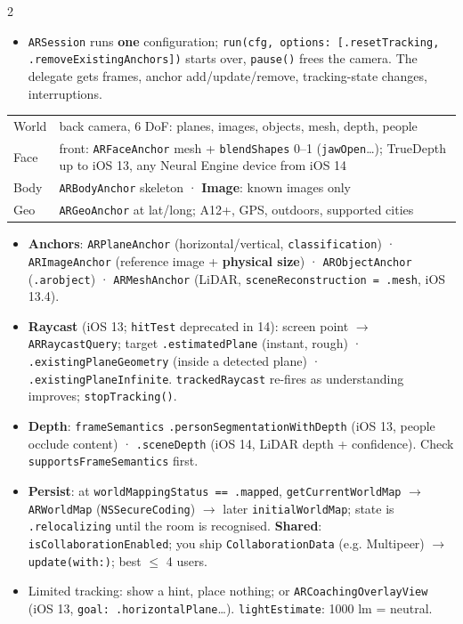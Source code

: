 \documentclass[8pt]{extarticle}
\newcommand\ct[1]{\texttt{#1}}
\newcommand\hd[1]{\par\vspace{3pt}\noindent{\bfseries\color{sheetBlue}#1}\par\vspace{1pt}}
\begin{document}
\begin{multicols}{2}
\raggedright{}

\hd{How ARKit works}
\begin{itemize}
  \item \ct{ARSession} runs \textbf{one} configuration; \ct{run(cfg, options: [.resetTracking,
        .removeExistingAnchors])} starts over, \ct{pause()} frees the camera. The delegate gets
        frames, anchor add/update/remove, tracking-state changes, interruptions.
\end{itemize}
{\footnotesize
\begin{tabular}{@{}>{\raggedright\arraybackslash}p{9mm}>{\raggedright\arraybackslash}p{64mm}@{}}
\toprule
\multicolumn{2}{@{}l}{\ct{AR\ldots Configuration}} \\ \midrule
World & back camera, 6 DoF: planes, images, objects, mesh, depth, people \\
Face & front: \ct{ARFaceAnchor} mesh + \ct{blendShapes} 0–1 (\ct{jawOpen}…); TrueDepth up to iOS 13, any Neural Engine device from iOS 14 \\
Body & \ct{ARBodyAnchor} skeleton · \textbf{Image}: known images only \\
Geo & \ct{ARGeoAnchor} at lat/long; A12+, GPS, outdoors, supported cities \\
\bottomrule
\end{tabular}}
\begin{itemize}
  \item \textbf{Anchors}: \ct{ARPlaneAnchor} (horizontal/vertical, \ct{classification}) ·
        \ct{ARImageAnchor} (reference image + \textbf{physical size}) · \ct{ARObjectAnchor}
        (\ct{.arobject}) · \ct{ARMeshAnchor} (LiDAR, \ct{sceneReconstruction = .mesh}, iOS 13.4).
  \item \textbf{Raycast} (iOS 13; \ct{hitTest} deprecated in 14): screen point $\to$
        \ct{ARRaycastQuery}; target \ct{.estimatedPlane} (instant, rough) ·
        \ct{.existingPlaneGeometry} (inside a detected plane) · \ct{.existingPlaneInfinite}.
        \ct{trackedRaycast} re-fires as understanding improves; \ct{stopTracking()}.
  \item \textbf{Depth}: \ct{frameSemantics} \ct{.personSegmentationWithDepth} (iOS 13, people
        occlude content) · \ct{.sceneDepth} (iOS 14, LiDAR depth + confidence). Check
        \ct{supportsFrameSemantics} first.
  \item \textbf{Persist}: at \ct{worldMappingStatus \hbox{=}\hbox{=} .mapped}, \ct{getCurrentWorldMap} $\to$
        \ct{ARWorldMap} (\ct{NSSecureCoding}) $\to$ later \ct{initialWorldMap}; state is
        \ct{.relocalizing} until the room is recognised. \textbf{Shared}: \ct{isCollaborationEnabled};
        you ship \ct{CollaborationData} (e.g. Multipeer) $\to$ \ct{update(with:)}; best $\leq$ 4 users.
  \item Limited tracking: show a hint, place nothing; or \ct{ARCoachingOverlayView} (iOS 13,
        \ct{goal: .horizontalPlane}…). \ct{lightEstimate}: 1000 lm = neutral.
\end{itemize}


\end{multicols}
\end{document}
